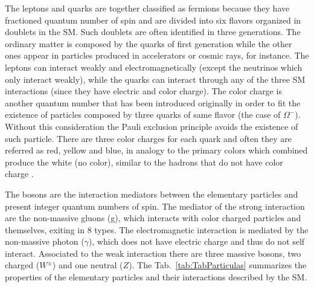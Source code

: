 The leptons and quarks are together classified as fermions because they have fractioned quantum number of spin and are divided into six flavors organized in doublets in the SM. Such doublets are often identified in three generations. The ordinary matter is composed by the quarks of first generation while the other ones appear in particles produced in accelerators or cosmic rays, for instance. The leptons can interact weakly and electromagnetically (except the neutrinos which only interact weakly), while the quarks can interact through any of the three SM interactions (since they have electric and color charge). The color charge is another quantum number that has been introduced originally in order to fit the existence of particles composed by three quarks of same flavor (the case of $\Omega^-$). Without this consideration the Pauli exclusion principle avoids the existence of such particle. There are three color charges for each quark and often they are referred as red, yellow and blue, in analogy to the primary colors which combined produce the white (no color), similar to the hadrons that do not have color charge \cite{bib:griffiths-2008,bib:halzen-martin-1984}.

The bosons are the interaction mediators between the elementary particles and present integer quantum numbers of spin. The mediator of the strong interaction are the non-massive gluons (g), which interacts with color charged particles and themselves, exiting in 8 types. The electromagnetic interaction is mediated by the non-massive photon ($\gamma$), which does not have electric charge and thus do not self interact. Associated to the weak interaction there are three massive bosons, two charged ($W^{\pm}$) and one neutral ($Z$). The Tab.~\ref{tab:TabParticulas} summarizes the properties of the elementary particles and their interactions described by the SM.

